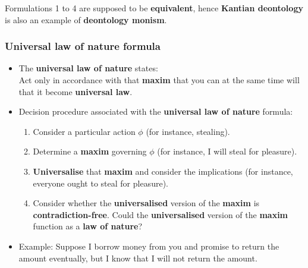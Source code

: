 \documentclass[11pt]{article}
\begin{document}
Formulations 1 to 4 are supposed to be \textbf{equivalent}, hence \textbf{Kantian deontology} is also an example of \textbf{deontology monism}.

 \newpage
\subsubsection{Universal law of nature formula}
\label{sec:orgcac97c6}
\begin{itemize}
\item The \textbf{universal law of nature} states:  \\
Act only in accordance with that \textbf{maxim} that you can at the same time will that it become \textbf{universal law}.
\item Decision procedure associated with the \textbf{universal law of nature} formula:
\begin{enumerate}
\item Consider a particular action \(\phi\) (for instance, stealing).
\item Determine a \textbf{maxim} governing \(\phi\) (for instance, I will steal for pleasure).
\item \textbf{Universalise} that \textbf{maxim} and consider the implications (for instance, everyone ought to steal for pleasure).
\item Consider whether the \textbf{universalised} version of the \textbf{maxim} is \textbf{contradiction-free}. Could the \textbf{universalised} version of the \textbf{maxim} function as a \textbf{law of nature}?
\end{enumerate}
\item Example:
Suppose I borrow money from you and promise to return the amount eventually, but I know that I will not return the amount.
\end{itemize}

 \newpage
\end{document}
